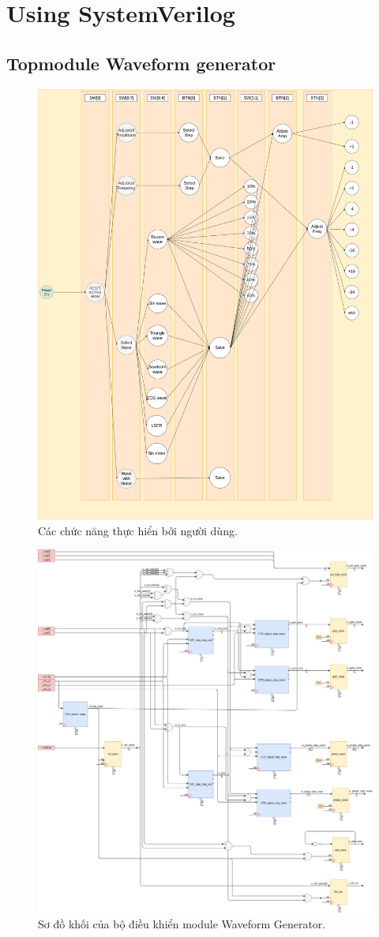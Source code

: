\section{Using SystemVerilog}

\subsection{Topmodule Waveform generator}

\begin{figure}[H]
	\centering
	\includegraphics[width=0.8\linewidth, height=0.7\textheight]{./../00_spec/spec/UI_task.png}
	\caption{Các chức năng thực hiển bởi người dùng.}
	\label{fig: UI_task}
\end{figure}

\begin{figure}[H]
	\centering
	\includegraphics[width=\linewidth]{./../00_spec/spec/UI_rtl.png}
	\caption{Sơ đồ khối của bộ điều khiển module Waveform Generator.}
	\label{fig: UI_rtl}
\end{figure}

